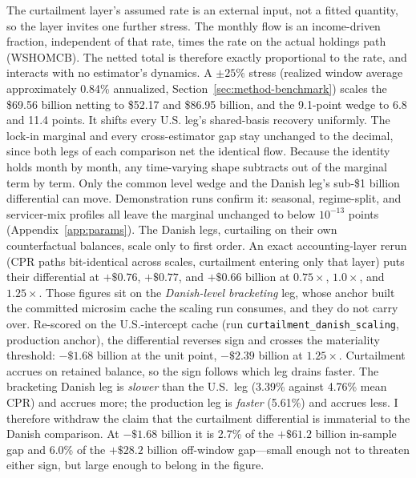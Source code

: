 \documentclass[12pt]{article}
\begin{document}
The curtailment layer's assumed rate is an external input, not a fitted quantity, so the layer invites one further stress. The monthly flow is an income-driven fraction, independent of that rate, times the rate on the actual holdings path (WSHOMCB). The netted total is therefore exactly proportional to the rate, and interacts with no estimator's dynamics. A $\pm 25\%$ stress (realized window average approximately 0.84\% annualized, Section~\ref{sec:method-benchmark}) scales the \$69.56 billion netting to \$52.17 and \$86.95 billion, and the 9.1-point wedge to 6.8 and 11.4 points. It shifts every U.S. leg's shared-basis recovery uniformly. The lock-in marginal and every cross-estimator gap stay unchanged to the decimal, since both legs of each comparison net the identical flow. Because the identity holds month by month, any time-varying shape subtracts out of the marginal term by term. Only the common level wedge and the Danish leg's sub-\$1 billion differential can move. Demonstration runs confirm it: seasonal, regime-split, and servicer-mix profiles all leave the marginal unchanged to below $10^{-13}$ points (Appendix~\ref{app:params}). The Danish legs, curtailing on their own counterfactual balances, scale only to first order. An exact accounting-layer rerun (CPR paths bit-identical across scales, curtailment entering only that layer) puts their differential at $+\$0.76$, $+\$0.77$, and $+\$0.66$ billion at $0.75\times$, $1.0\times$, and $1.25\times$. Those figures sit on the \emph{Danish-level bracketing} leg, whose anchor built the committed microsim cache the scaling run consumes, and they do not carry over. Re-scored on the U.S.-intercept cache (run \texttt{curtailment\_danish\_scaling}, production anchor), the differential reverses sign and crosses the materiality threshold: $-\$1.68$ billion at the unit point, $-\$2.39$ billion at $1.25\times$. Curtailment accrues on retained balance, so the sign follows which leg drains faster. The bracketing Danish leg is \emph{slower} than the U.S.\ leg (3.39\% against 4.76\% mean CPR) and accrues more; the production leg is \emph{faster} (5.61\%) and accrues less. I therefore withdraw the claim that the curtailment differential is immaterial to the Danish comparison. At $-\$1.68$ billion it is 2.7\% of the $+\$61.2$ billion in-sample gap and 6.0\% of the $+\$28.2$ billion off-window gap---small enough not to threaten either sign, but large enough to belong in the figure.
\end{document}
